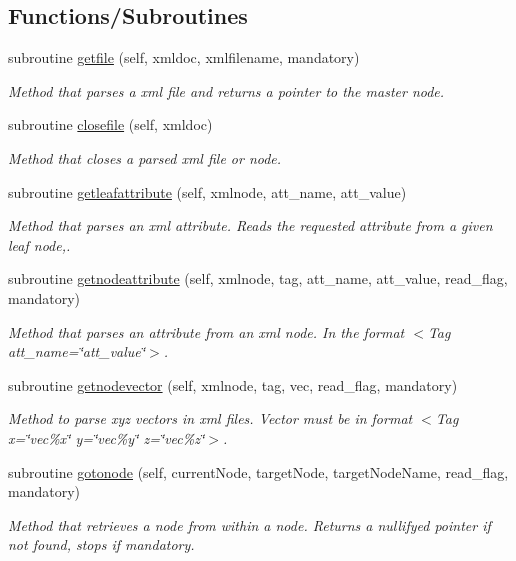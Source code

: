 \subsection*{Functions/\+Subroutines}
\begin{DoxyCompactItemize}
\item 
subroutine \mbox{\hyperlink{namespacexmlparser__mod_af7265285af04ac926f946c2989ed85b4}{getfile}} (self, xmldoc, xmlfilename, mandatory)
\begin{DoxyCompactList}\small\item\em Method that parses a xml file and returns a pointer to the master node. \end{DoxyCompactList}\item 
subroutine \mbox{\hyperlink{namespacexmlparser__mod_a9eed98475e0d55a3c7b2eeb88925a48c}{closefile}} (self, xmldoc)
\begin{DoxyCompactList}\small\item\em Method that closes a parsed xml file or node. \end{DoxyCompactList}\item 
subroutine \mbox{\hyperlink{namespacexmlparser__mod_a3e977c7792b08b009a09cc1f7fb4f80a}{getleafattribute}} (self, xmlnode, att\+\_\+name, att\+\_\+value)
\begin{DoxyCompactList}\small\item\em Method that parses an xml attribute. Reads the requested attribute from a given leaf node,. \end{DoxyCompactList}\item 
subroutine \mbox{\hyperlink{namespacexmlparser__mod_ade14a3d90326f84cfa52844aa4a16b75}{getnodeattribute}} (self, xmlnode, tag, att\+\_\+name, att\+\_\+value, read\+\_\+flag, mandatory)
\begin{DoxyCompactList}\small\item\em Method that parses an attribute from an xml node. In the format \textquotesingle{}$<$\+Tag att\+\_\+name=\char`\"{}att\+\_\+value\char`\"{}$>$\textquotesingle{}. \end{DoxyCompactList}\item 
subroutine \mbox{\hyperlink{namespacexmlparser__mod_a0c2ac0513cee4e660e07cb083a790a53}{getnodevector}} (self, xmlnode, tag, vec, read\+\_\+flag, mandatory)
\begin{DoxyCompactList}\small\item\em Method to parse xyz vectors in xml files. Vector must be in format \textquotesingle{}$<$\+Tag x=\char`\"{}vec\%x\char`\"{} y=\char`\"{}vec\%y\char`\"{} z=\char`\"{}vec\%z\char`\"{}$>$\textquotesingle{}. \end{DoxyCompactList}\item 
subroutine \mbox{\hyperlink{namespacexmlparser__mod_acd860c3d06a25fc422edbcc3d356d976}{gotonode}} (self, current\+Node, target\+Node, target\+Node\+Name, read\+\_\+flag, mandatory)
\begin{DoxyCompactList}\small\item\em Method that retrieves a node from within a node. Returns a nullifyed pointer if not found, stops if mandatory. \end{DoxyCompactList}\end{DoxyCompactItemize}
